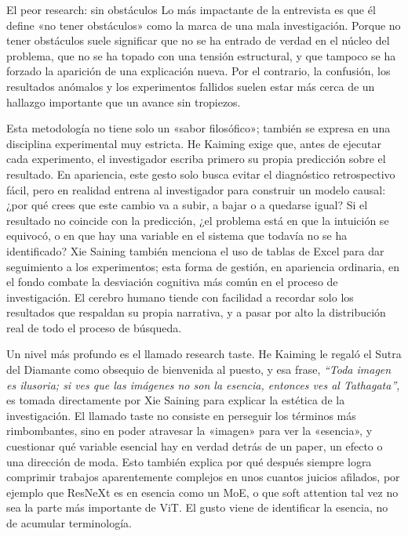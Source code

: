 \begin{warningbox}{El peor research: sin obstáculos}
Lo más impactante de la entrevista es que él define «no tener obstáculos» como la marca de una mala investigación. Porque no tener obstáculos suele significar que no se ha entrado de verdad en el núcleo del problema, que no se ha topado con una tensión estructural, y que tampoco se ha forzado la aparición de una explicación nueva. Por el contrario, la confusión, los resultados anómalos y los experimentos fallidos suelen estar más cerca de un hallazgo importante que un avance sin tropiezos.
\end{warningbox}

Esta metodología no tiene solo un «sabor filosófico»; también se expresa en una disciplina experimental muy estricta. He Kaiming exige que, antes de ejecutar cada experimento, el investigador escriba primero su propia predicción sobre el resultado. En apariencia, este gesto solo busca evitar el diagnóstico retrospectivo fácil, pero en realidad entrena al investigador para construir un modelo causal: ¿por qué crees que este cambio va a subir, a bajar o a quedarse igual? Si el resultado no coincide con la predicción, ¿el problema está en que la intuición se equivocó, o en que hay una variable en el sistema que todavía no se ha identificado? Xie Saining también menciona el uso de tablas de Excel para dar seguimiento a los experimentos; esta forma de gestión, en apariencia ordinaria, en el fondo combate la desviación cognitiva más común en el proceso de investigación. El cerebro humano tiende con facilidad a recordar solo los resultados que respaldan su propia narrativa, y a pasar por alto la distribución real de todo el proceso de búsqueda.

Un nivel más profundo es el llamado research taste. He Kaiming le regaló el Sutra del Diamante como obsequio de bienvenida al puesto, y esa frase, \textit{``Toda imagen es ilusoria; si ves que las imágenes no son la esencia, entonces ves al Tathagata''}, es tomada directamente por Xie Saining para explicar la estética de la investigación. El llamado taste no consiste en perseguir los términos más rimbombantes, sino en poder atravesar la «imagen» para ver la «esencia», y cuestionar qué variable esencial hay en verdad detrás de un paper, un efecto o una dirección de moda. Esto también explica por qué después siempre logra comprimir trabajos aparentemente complejos en unos cuantos juicios afilados, por ejemplo que ResNeXt es en esencia como un MoE, o que soft attention tal vez no sea la parte más importante de ViT. El gusto viene de identificar la esencia, no de acumular terminología.

